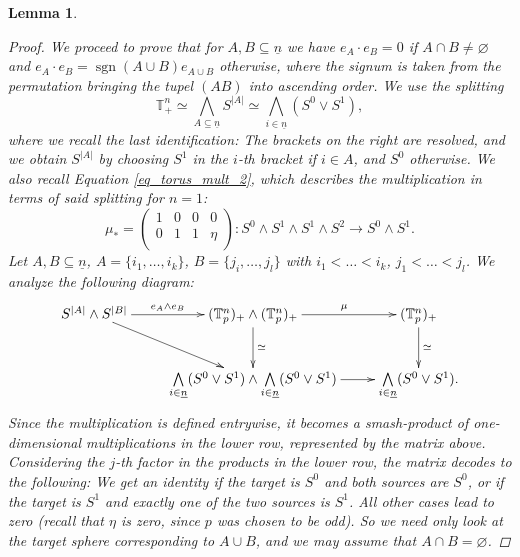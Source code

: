 \documentclass[10pt, a4paper, UKenglish]{article}
\numberwithin{equation}{section}
\newcommand{\sT}{\mathbb{T}}		%
\newcommand{\abs}[1]{\left\vert#1\right\vert}	%
\newcommand{\ind}[1]{\underline{#1}}
\newcommand{\n}{\ind{n}}
\newcommand{\sgn}{\operatorname{sgn}}
\theoremstyle{plain}
\newtheorem{lem}[equation]{Lemma}
\theoremstyle{definition}
\renewcommand{\to}{\longrightarrow}
\begin{document}
\begin{lem}
\begin{proof}
We proceed to prove that for $A,B \subseteq \ind{n}$ we have $e_A \cdot e_B = 0$ if $A \cap B \neq \varnothing$ and $e_A \cdot e_B = \sgn(A \cup B) e_{A\cup B}$ otherwise, where the signum is taken from the permutation bringing the tupel $(AB)$ into ascending order. We use the splitting%
$$\sT^n_+ \simeq \bigwedge_{ A \subseteq \ind{n} } S^{\abs{A}} \simeq %
\bigwedge_{ i \in \ind{n} } (S^0 \vee S^1),$$
where we recall the last identification: The brackets on the right are resolved, and we obtain $S^{\abs{A}}$ by choosing $S^1$ in the $i$-th bracket if $i \in A$, and $S^0$ otherwise. We also recall Equation \ref{eq_torus_mult_2}, which describes the multiplication in terms of said splitting for $n=1$:
\begin{equation*}\mu_* = %
\left( \begin{array}{cccc}
1 & 0 & 0 & 0 \\
0 & 1 & 1 & \eta \\
\end{array} \right): S^0 \wedge S^1 \wedge S^1 \wedge S^2 \to S^0 \wedge S^1 .\end{equation*}
Let $A, B \subseteq \ind{n}$, $A = \{i_1, \ldots, i_k\}$, $B = \{j_i, \ldots, j_l \}$ with $i_1 \less \ldots \less i_k$, $j_1 \less \ldots \less j_l$. We analyze the following diagram:
\[
\xymatrix{
  S^{\abs{A}} \wedge S^{\abs{B}} \ar[r]^-{e_A \wedge e_B} \ar[dr] & %
  (\sT_p^n)_+ \wedge (\sT_p^n)_+ \ar[r]^(.55){\mu} \ar[d]^{\simeq} & %
  (\sT_p^n)_+ \ar[d]^{\simeq} \\ %
  & %
  \bigwedge\limits_{i \in \n} (S^0 \vee S^1) \wedge %
    \bigwedge\limits_{i \in \n} (S^0 \vee S^1) \ar[r] & %
  \bigwedge\limits_{i \in \n} (S^0 \vee S^1).
}
\]
Since the multiplication is defined entrywise, it becomes a smash-product of one-dimensional multiplications in the lower row, represented by the matrix above. Considering the $j$-th factor in the products in the lower row, the matrix decodes to the following: We get an identity if the target is $S^0$ and both sources are $S^0$, or if the target is $S^1$ and exactly one of the two sources is $S^1$. All other cases lead to zero (recall that $\eta$ is zero, since $p$ was chosen to be odd). So we need only look at the target sphere corresponding to $A \cup B$, and we may assume that $A \cap B = \varnothing$.


\end{proof}
\end{lem}
\end{document}
